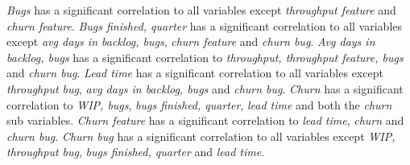 \documentclass[UKenglish]{ifimaster}  %
\begin{document}
\textit{Bugs} has a significant correlation to all variables except \textit{throughput feature} and \textit{churn feature}. \textit{Bugs finished, quarter} has a significant correlation to all variables except \textit{avg days in backlog, bugs}, \textit{churn feature} and \textit{churn bug}. \textit{Avg days in backlog, bugs} has a significant correlation to \textit{throughput, throughput feature, bugs} and \textit{churn bug}. \textit{Lead time} has a significant correlation to all variables except \textit{throughput bug}, \textit{avg days in backlog, bugs} and \textit{churn bug}. \textit{Churn} has a significant correlation to \textit{WIP, bugs}, \textit{bugs finished, quarter}, \textit{lead time} and both the \textit{churn} sub variables. \textit{Churn feature} has a significant correlation to \textit{lead time}, \textit{churn} and \textit{churn bug}. \textit{Churn bug} has a significant correlation to all variables except \textit{WIP, throughput bug}, \textit{bugs finished, quarter} and \textit{lead time}. 
\newpage
\end{document}
